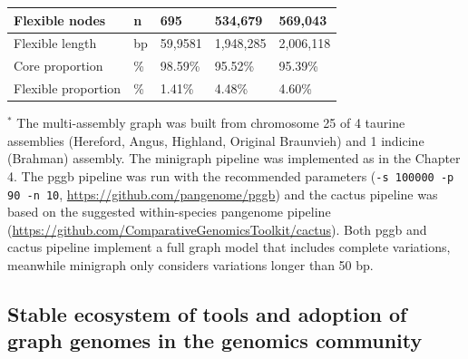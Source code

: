 \documentclass[../main.tex]{subfiles}
\begin{document}
\begin{table}[!htb]
\begin{center}
\begin{tabular}{|l|l|l|l|l|}
   \hline
   Flexible nodes                            & n                                  & 695                                              & 534,679                                     & 569,043                                        \\ 
   \hline
   Flexible length                           & bp                                 & 59,9581                                          & 1,948,285                                   & 2,006,118                                      \\ 
   \hline
   Core proportion                           & \%                                 & 98.59\%                                          & 95.52\%                                     & 95.39\%                                        \\ 
   \hline
   Flexible proportion                       & \%                                 & 1.41\%                                           & 4.48\%                                      & 4.60\%                                         \\
   \hline
   \end{tabular}
   \label{tab52:mtc}
   \end{center}
   \footnotesize{$^*$ The multi-assembly graph was built from chromosome 25 of 4 taurine assemblies (Hereford, Angus, Highland, Original Braunvieh) and 1 indicine (Brahman) assembly. The minigraph pipeline was implemented as in the Chapter 4. The pggb pipeline was run with the recommended parameters (\texttt{-s 100000 -p 90 -n 10}, \url{https://github.com/pangenome/pggb}) and the cactus pipeline was based on the suggested within-species pangenome pipeline (\url{https://github.com/ComparativeGenomicsToolkit/cactus}). Both pggb and cactus pipeline implement a full graph model that includes complete variations, meanwhile minigraph only considers variations longer than 50 bp. \\
   }
\end{table}

\subsection*{Stable ecosystem of tools and adoption of graph genomes in the genomics community}
\end{document}

